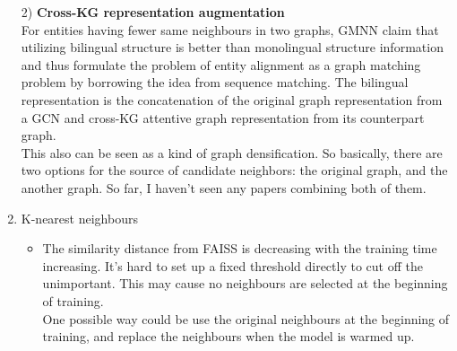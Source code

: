 \begin{enumerate}
\begin{itemize}
        
    \end{itemize}
         2) \textbf{Cross-KG representation augmentation} \\
         For entities having fewer same neighbours in two graphs, GMNN \citep{xu-etal-2019-cross-lingual} claim that utilizing bilingual structure is better than monolingual structure information and thus formulate the problem of entity alignment as a graph matching problem by borrowing the idea from sequence matching. The bilingual representation is the concatenation of the original graph representation from a GCN and cross-KG attentive graph representation from its counterpart graph. \\
        This also can be seen as a kind of graph densification. 
        So basically, there are two options for the source of candidate neighbors: the original graph, and the another graph. So far, I haven't seen any papers combining both of them. 
    \item  K-nearest neighbours 
         \begin{itemize}
             \item  The similarity distance from FAISS is decreasing with the training time increasing. It's hard to set up a fixed threshold directly to cut off the unimportant. This may cause  no neighbours are selected at the beginning of training. \\ 
             One possible way could be use the original neighbours at the beginning of training, and replace the neighbours when the model is warmed up.

\end{itemize}
\end{enumerate}
